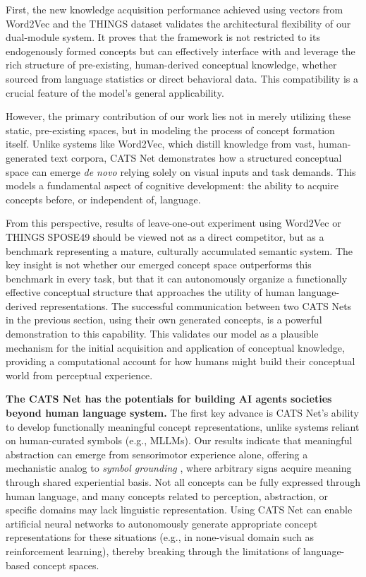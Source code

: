 \documentclass[pdflatex,sn-mathphys-num,lineno]{sn-jnl}%
\begin{document}
\begin{CJK}{UTF8}{gbsn}
First, the new knowledge acquisition performance achieved using vectors from Word2Vec and the THINGS dataset validates the architectural flexibility of our dual-module system. It proves that the framework is not restricted to its endogenously formed concepts but can effectively interface with and leverage the rich structure of pre-existing, human-derived conceptual knowledge, whether sourced from language statistics or direct behavioral data. This compatibility is a crucial feature of the model's general applicability.

However, the primary contribution of our work lies not in merely utilizing these static, pre-existing spaces, but in modeling the process of concept formation itself. Unlike systems like Word2Vec, which distill knowledge from vast, human-generated text corpora, CATS Net demonstrates how a structured conceptual space can emerge \textit{de novo} relying solely on visual inputs and task demands. This models a fundamental aspect of cognitive development: the ability to acquire concepts before, or independent of, language.

From this perspective, results of leave-one-out experiment using Word2Vec or THINGS SPOSE49 should be viewed not as a direct competitor, but as a benchmark representing a mature, culturally accumulated semantic system. The key insight is not whether our emerged concept space outperforms this benchmark in every task, but that it can autonomously organize a functionally effective conceptual structure that approaches the utility of human language-derived representations. The successful communication between two CATS Nets in the previous section, using their own generated concepts, is a powerful demonstration to this capability. This validates our model as a plausible mechanism for the initial acquisition and application of conceptual knowledge, providing a computational account for how humans might build their conceptual world from perceptual experience.

\textbf{The CATS Net has the potentials for building AI agents societies beyond human language system.} The first key advance is CATS Net's ability to develop functionally meaningful concept representations, unlike systems reliant on human-curated symbols (e.g., MLLMs). Our results indicate that meaningful abstraction can emerge from sensorimotor experience alone, offering a mechanistic analog to \textit{symbol grounding} \cite{harnad_symbol_1990}, where arbitrary signs acquire meaning through shared experiential basis. Not all concepts can be fully expressed through human language, and many concepts related to perception, abstraction, or specific domains may lack linguistic representation. Using CATS Net can enable artificial neural networks to autonomously generate appropriate concept representations for these situations (e.g., in none-visual domain such as reinforcement learning), thereby breaking through the limitations of language-based concept spaces.


\end{CJK}
\end{document}
